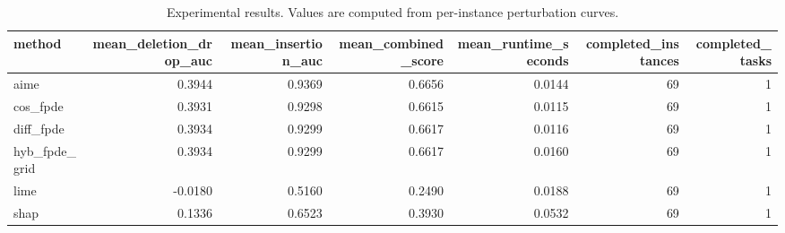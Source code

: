 \begin{table}[t]
\caption{Experimental results. Values are computed from per-instance perturbation curves.}
\label{tab:main_results_computed}
\centering
\begin{tabular}{lrrrrrr}
\toprule
method & mean\_deletion\_drop\_auc & mean\_insertion\_auc & mean\_combined\_score & mean\_runtime\_seconds & completed\_instances & completed\_tasks \\
\midrule
aime & 0.3944 & 0.9369 & 0.6656 & 0.0144 & 69 & 1 \\
cos\_fpde & 0.3931 & 0.9298 & 0.6615 & 0.0115 & 69 & 1 \\
diff\_fpde & 0.3934 & 0.9299 & 0.6617 & 0.0116 & 69 & 1 \\
hyb\_fpde\_grid & 0.3934 & 0.9299 & 0.6617 & 0.0160 & 69 & 1 \\
lime & -0.0180 & 0.5160 & 0.2490 & 0.0188 & 69 & 1 \\
shap & 0.1336 & 0.6523 & 0.3930 & 0.0532 & 69 & 1 \\
\bottomrule
\end{tabular}

\end{table}
